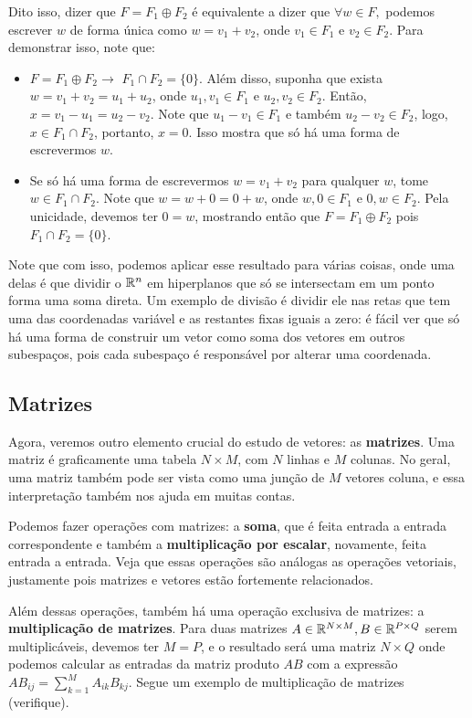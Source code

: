 \documentclass[11pt, a4paper]{article}
\begin{document}
Dito isso, dizer que \(F=F_1 \oplus F_2\) é equivalente a dizer que \(\forall w\in F,\) podemos escrever \(w\) de forma única como \(w=v_1+v_2\), onde \(v_1\in F_1\) e \(v_2 \in F_2\). Para demonstrar isso, note que:

\begin{itemize}
    \item \(F=F_1 \oplus F_2 \rightarrow\) \(F_1 \cap F_2=\{0\}\). Além disso, suponha que exista \(w=v_1+v_2=u_1+u_2\), onde \(u_1,v_1\in F_1\) e \(u_2,v_2 \in F_2\). Então, \(x=v_1-u_1=u_2-v_2\). Note que \(u_1-v_1\in F_1\) e também \(u_2-v_2 \in F_2\), logo, \(x \in F_1 \cap F_2\), portanto, \(x=0\). Isso mostra que só há uma forma de escrevermos \(w\).

    \item Se só há uma forma de escrevermos \(w=v_1+v_2\) para qualquer \(w\), tome \(w \in F_1 \cap F_2\). Note que \(w=w+0=0+w\), onde \(w,0\in F_1\) e \(0,w \in F_2\). Pela unicidade, devemos ter \(0=w\), mostrando então que \(F=F_1 \oplus F_2\) pois \(F_1 \cap F_2 = \{0\}\).
\end{itemize}

Note que com isso, podemos aplicar esse resultado para várias coisas, onde uma delas é que dividir o \(\mathbb{R}^n\) em hiperplanos que só se intersectam em um ponto forma uma soma direta. Um exemplo de divisão é dividir ele nas retas que tem uma das coordenadas variável e as restantes fixas iguais a zero: é fácil ver que só há uma forma de construir um vetor como soma dos vetores em outros subespaços, pois cada subespaço é responsável por alterar uma coordenada.

\subsection{Matrizes}

Agora, veremos outro elemento crucial do estudo de vetores: as \textbf{matrizes}. Uma matriz é graficamente uma tabela \(N\times M\), com \(N\) linhas e \(M\) colunas. No geral, uma matriz também pode ser vista como uma junção de \(M\) vetores coluna, e essa interpretação também nos ajuda em muitas contas.

Podemos fazer operações com matrizes: a \textbf{soma}, que é feita entrada a entrada correspondente e também a \textbf{multiplicação por escalar}, novamente, feita entrada a entrada. Veja que essas operações são análogas as operações vetoriais, justamente pois matrizes e vetores estão fortemente relacionados.

Além dessas operações, também há uma operação exclusiva de matrizes: a \textbf{multiplicação de matrizes}. Para duas matrizes \(A \in \mathbb{R}^{N \times M}, B \in \mathbb{R}^{P \times Q}\) serem multiplicáveis, devemos ter \(M=P\), e o resultado será uma matriz \(N \times Q\) onde podemos calcular as entradas da matriz produto \(AB\) com a expressão \(\displaystyle AB_{ij}=\sum_{k=1}^{M}A_{ik}B_{kj}\). Segue um exemplo de multiplicação de matrizes (verifique).
\end{document}
